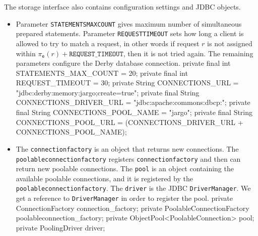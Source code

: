 The storage interface also contains configuration settings and JDBC objects.
\begin{itemize}
\item Parameter
{\tt{}STATEMENTS{}MAX{}COUNT} gives maximum number of simultaneous prepared
statements. Parameter {\tt{}REQUEST{}TIMEOUT} sets how long a client is allowed to
try to match a request, in other words if request $r$ is not assigned within
$\pi_\texttt{e}(r)+\texttt{REQUEST\_TIMEOUT}$, then it is not tried again.
The remaining parameters configure the Derby database connection.
\nwenddocs{}\plusendmoddef
private final int    STATEMENTS_MAX_COUNT   = 20;
private final int    REQUEST_TIMEOUT        = 30;
private       String CONNECTIONS_URL        = "jdbc:derby:memory:jargo;create=true";
private final String CONNECTIONS_DRIVER_URL = "jdbc:apache:commons:dbcp:";
private final String CONNECTIONS_POOL_NAME  = "jargo";
private final String CONNECTIONS_POOL_URL   = (CONNECTIONS_DRIVER_URL + CONNECTIONS_POOL_NAME);
\nwendcode{}\nwdocspar
\item The {\tt{}connection{}factory} is an object that returns new connections. The
{\tt{}poolableconnection{}factory} registers {\tt{}connection{}factory} and then can
return new poolable connections.  The {\tt{}pool} is an object containing the
available poolable connections, and it is registered by the
{\tt{}poolableconnection{}factory}. The {\tt{}driver} is the JDBC {\tt{}DriverManager}.
We get a reference to {\tt{}DriverManager} in order to register the pool.
\nwenddocs{}\plusendmoddef
private ConnectionFactory               connection_factory;
private PoolableConnectionFactory       poolableconnection_factory;
private ObjectPool<PoolableConnection>  pool;
private PoolingDriver                   driver;
\nwendcode{}\nwdocspar
\end{itemize}

